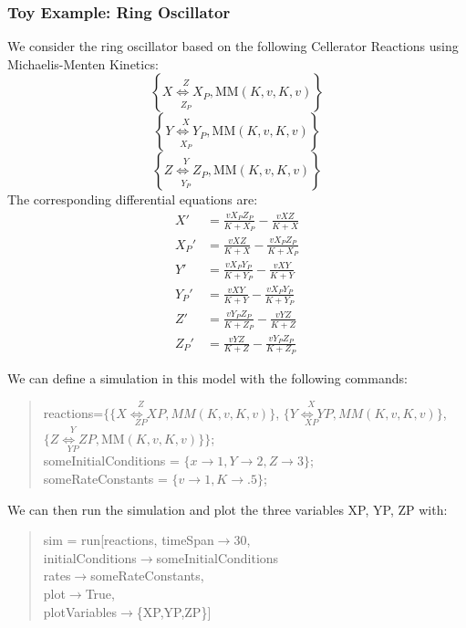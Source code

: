 \documentclass[12pt,letterpaper]{article}
\begin{document}
\subsubsection{Toy Example: Ring Oscillator}

We consider the ring oscillator based on the following Cellerator Reactions using 
Michaelis-Menten Kinetics: 
$$\left\{\underset{Z_P}{\overset{Z}{X\Longleftrightarrow {X_P}}},\text{MM}(K,v,K,v)\right\}$$
$$\left\{\underset{X_P}{\overset{X}{Y\Longleftrightarrow {Y_P}}},\text{MM}(K,v,K,v)\right\}$$
$$\left\{\underset{Y_P}{\overset{Y}{Z\Longleftrightarrow {Z_P}}},\text{MM}(K,v,K,v)\right\}$$
The corresponding differential equations are: 
\begin{align*}
X'&=\frac{v X_P Z_P}{K+X_P}-\frac{v X Z}{K+X}\\
X_P'&=\frac{v X Z}{K+X}-\frac{v X_P Z_P}{K+X_P}\\
Y'&=\frac{v X_P Y_P}{K+Y_P}-\frac{v X Y}{K+Y}\\
Y_P'&=\frac{v X Y}{K+Y}-\frac{v X_P Y_P}{K+Y_P}\\
Z'&=\frac{v Y_P Z_P}{K+Z_P}-\frac{v Y Z}{K+Z}\\
Z_P'&=\frac{v Y Z}{K+Z}-\frac{v Y_P Z_P}{K+Z_P}
\end{align*}

We can define a simulation in this model with the following commands: 
\begin{verse}
{\ttfamily reactions}=$\{\{ \underset{{ZP}}{\overset{Z}{X\Longleftrightarrow{XP}}}, {MM}(K,v,K,v) \}$,
$\{ \underset{{XP}}{\overset{X}{Y\Longleftrightarrow{YP}}}, {MM}(K,v,K,v) \}$,
$\{ \underset{{YP}}{\overset{Y}{Z\Longleftrightarrow{ZP}}}, \text{MM}(K,v,K,v)\}\}$;\\

{\ttfamily someInitialConditions} = $\{x\to 1, Y\to 2, Z\to 3\}$;\\

{\ttfamily someRateConstants} = $\{v\to 1, K\to .5\}$;
\end{verse}

We can then run the simulation and plot the three variables XP, YP, ZP with: 
\begin{verse}

{\ttfamily sim = run[reactions, timeSpan$\to$30, \\initialConditions$\to$someInitialConditions\\
rates$\to$someRateConstants, \\plot$\to$True, \\plotVariables$\to$\{XP,YP,ZP\}]}
\end{verse}
\end{document}
